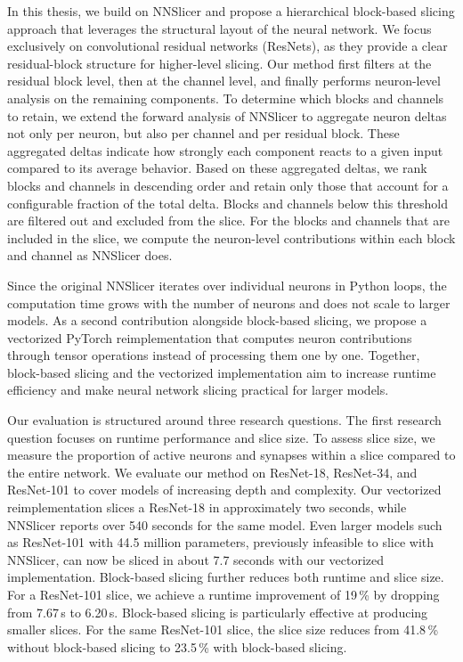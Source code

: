 \documentclass[
12pt,
fancyheadings,
a4paper,
twoside,
BCOR=0.7cm,
nobcorignoretitle,
grayscalebody,
]{stsreprt}
\begin{document}
In this thesis, we build on NNSlicer and propose a hierarchical block-based slicing approach that
leverages the structural layout of the neural network.
We focus exclusively on convolutional residual networks (ResNets), as they provide a clear
residual-block structure for higher-level slicing.
Our method first filters at the residual block level, then at the channel level, and finally
performs neuron-level analysis on the remaining components.
To determine which blocks and channels to retain, we extend the forward analysis of NNSlicer to
aggregate neuron deltas not only per neuron, but also per channel and per residual block.
These aggregated deltas indicate how strongly each component reacts to a given input compared to
its average behavior.
Based on these aggregated deltas, we rank blocks and channels in descending order and retain only
those that account for a configurable fraction of the total delta. Blocks and channels below this
threshold are filtered out and excluded from the slice.
For the blocks and channels that are included in the slice, we compute the neuron-level
contributions within each block and channel as NNSlicer does. 

Since the original NNSlicer iterates over individual neurons in Python loops, the computation time
grows with the number of neurons and does not scale to larger models. 
As a second contribution alongside block-based slicing, we propose a vectorized PyTorch
reimplementation that computes neuron contributions through tensor operations instead of processing
them one by one.
Together, block-based slicing and the vectorized implementation aim to increase runtime efficiency
and make neural network slicing practical for larger models.

Our evaluation is structured around three research questions.
The first research question focuses on runtime performance and slice size.
To assess slice size, we measure the proportion of active neurons and synapses within a slice
compared to the entire network.
We evaluate our method on ResNet-18, ResNet-34, and ResNet-101 to cover models of increasing depth
and complexity.
Our vectorized reimplementation slices a ResNet-18 in approximately two seconds, while NNSlicer
reports over 540 seconds for the same model.
Even larger models such as ResNet-101 with 44.5 million parameters, previously infeasible to slice
with NNSlicer, can now be sliced in about 7.7 seconds with our vectorized implementation.
Block-based slicing further reduces both runtime and slice size.
For a ResNet-101 slice, we achieve a runtime improvement of 19\,\% by dropping from 7.67\,s to
6.20\,s.
Block-based slicing is particularly effective at producing smaller slices. For the same ResNet-101
slice, the slice size reduces from 41.8\,\% without block-based slicing to 23.5\,\% with
block-based slicing.
\end{document}
